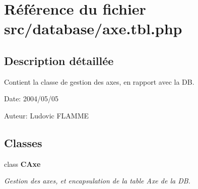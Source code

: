 \section{Référence du fichier src/database/axe.tbl.php}
\label{axe_8tbl_8php}


\subsection{Description détaillée}
Contient la classe de gestion des axes, en rapport avec la DB. 

\begin{Desc}
\item[Date:]2004/05/05\end{Desc}
\begin{Desc}
\item[Auteur:]Ludovic FLAMME \end{Desc}


\subsection*{Classes}
\begin{CompactItemize}
\item 
class {\bf CAxe}
\begin{CompactList}\small\item\em Gestion des axes, et encapsulation de la table Axe de la DB. \item\end{CompactList}\end{CompactItemize}
